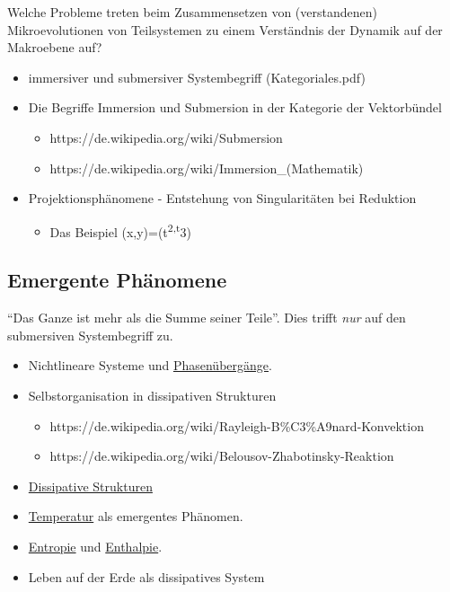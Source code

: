 \documentclass[11pt,a4paper]{article}
\begin{document}
Welche Probleme treten beim Zusammensetzen von (verstandenen)
Mikroevolutionen von Teilsystemen zu einem Verständnis der Dynamik auf
der Makroebene auf?

\begin{itemize}
[noitemsep]
\item
  immersiver und submersiver Systembegriff (Kategoriales.pdf)
\item
  Die Begriffe Immersion und Submersion in der Kategorie der
  Vektorbündel

  \begin{itemize}
  [noitemsep]
  \item
    https://de.wikipedia.org/wiki/Submersion
  \item
    https://de.wikipedia.org/wiki/Immersion\_(Mathematik)
  \end{itemize}
\item
  Projektionsphänomene - Entstehung von Singularitäten bei Reduktion

  \begin{itemize}
  [noitemsep]
  \item
    Das Beispiel (x,y)=(t\textsuperscript{2,t}3)
  \end{itemize}
\end{itemize}

\hypertarget{emergente-phuxe4nomene}{%
\subsection{Emergente Phänomene}\label{emergente-phuxe4nomene}}

``Das Ganze ist mehr als die Summe seiner Teile''. Dies trifft
\emph{nur} auf den submersiven Systembegriff zu.

\begin{itemize}
[noitemsep]
\item
  Nichtlineare Systeme und
  \href{https://de.wikipedia.org/wiki/Phasen\%C3\%BCbergang}{Phasenübergänge}.
\item
  Selbstorganisation in dissipativen Strukturen

  \begin{itemize}
  [noitemsep]
  \item
    https://de.wikipedia.org/wiki/Rayleigh-B\%C3\%A9nard-Konvektion
  \item
    https://de.wikipedia.org/wiki/Belousov-Zhabotinsky-Reaktion
  \end{itemize}
\item
  \href{https://de.wikipedia.org/wiki/Dissipative_Struktur}{Dissipative
  Strukturen}
\item
  \href{https://de.wikipedia.org/wiki/Temperatur}{Temperatur} als
  emergentes Phänomen.
\item
  \href{https://de.wikipedia.org/wiki/Entropie}{Entropie} und
  \href{https://de.wikipedia.org/wiki/Enthalpie}{Enthalpie}.
\item
  Leben auf der Erde als dissipatives System
\end{itemize}
\end{document}
